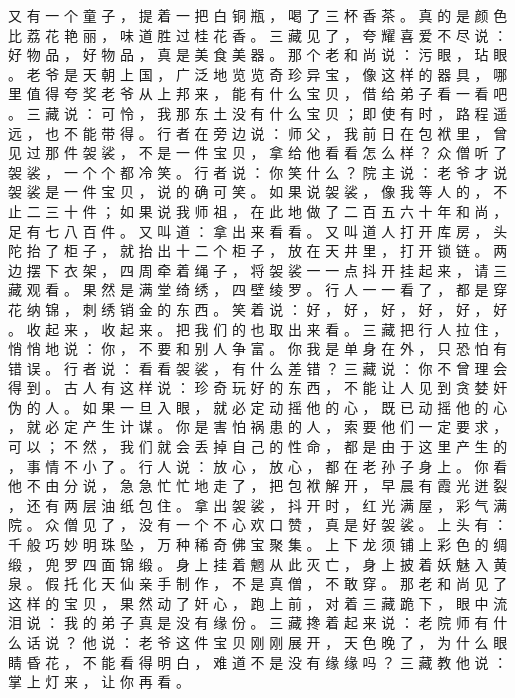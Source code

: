 {又 有 一 个 童 子 ， 提 着 一 把 白 铜 瓶 ， 喝 了 三 杯 香 茶 。
真 的 是 颜 色 比 荔 花 艳 丽 ， 味 道 胜 过 桂 花 香 。
三 藏 见 了 ， 夸 耀 喜 爱 不 尽 说 ： 好 物 品 ， 好 物 品 ， 真 是 美 食 美 器 。
那 个 老 和 尚 说 ： 污 眼 ， 玷 眼 。
老 爷 是 天 朝 上 国 ， 广 泛 地 览 览 奇 珍 异 宝 ， 像 这 样 的 器 具 ， 哪 里 值 得 夸 奖 老 爷 从 上 邦 来 ， 能 有 什 么 宝 贝 ， 借 给 弟 子 看 一 看 吧 。 三 藏 说 ： 可 怜 ， 我 那 东 土 没 有 什 么 宝 贝 ； 即 使 有 时 ， 路 程 遥 远 ， 也 不 能 带 得 。
行 者 在 旁 边 说 ： 师 父 ， 我 前 日 在 包 袱 里 ， 曾 见 过 那 件 袈 裟 ， 不 是 一 件 宝 贝 ， 拿 给 他 看 看 怎 么 样 ？ 众 僧 听 了 袈 裟 ， 一 个 个 都 冷 笑 。
行 者 说 ： 你 笑 什 么 ？ 院 主 说 ： 老 爷 才 说 袈 裟 是 一 件 宝 贝 ， 说 的 确 可 笑 。
如 果 说 袈 裟 ， 像 我 等 人 的 ， 不 止 二 三 十 件 ； 如 果 说 我 师 祖 ， 在 此 地 做 了 二 百 五 六 十 年 和 尚 ， 足 有 七 八 百 件 。
又 叫 道 ： 拿 出 来 看 看 。
又 叫 道 人 打 开 库 房 ， 头 陀 抬 了 柜 子 ， 就 抬 出 十 二 个 柜 子 ， 放 在 天 井 里 ， 打 开 锁 链 。
两 边 摆 下 衣 架 ， 四 周 牵 着 绳 子 ， 将 袈 裟 一 一 点 抖 开 挂 起 来 ， 请 三 藏 观 看 。
果 然 是 满 堂 绮 绣 ， 四 壁 绫 罗 。
行 人 一 一 看 了 ， 都 是 穿 花 纳 锦 ， 刺 绣 销 金 的 东 西 。 笑 着 说 ： 好 ， 好 ， 好 ， 好 ， 好 ， 好 。
收 起 来 ， 收 起 来 。
把 我 们 的 也 取 出 来 看 。
三 藏 把 行 人 拉 住 ， 悄 悄 地 说 ： 你 ， 不 要 和 别 人 争 富 。
你 我 是 单 身 在 外 ， 只 恐 怕 有 错 误 。
行 者 说 ： 看 看 袈 裟 ， 有 什 么 差 错 ？ 三 藏 说 ： 你 不 曾 理 会 得 到 。
古 人 有 这 样 说 ： 珍 奇 玩 好 的 东 西 ， 不 能 让 人 见 到 贪 婪 奸 伪 的 人 。
如 果 一 旦 入 眼 ， 就 必 定 动 摇 他 的 心 ， 既 已 动 摇 他 的 心 ， 就 必 定 产 生 计 谋 。
你 是 害 怕 祸 患 的 人 ， 索 要 他 们 一 定 要 求 ， 可 以 ； 不 然 ， 我 们 就 会 丢 掉 自 己 的 性 命 ， 都 是 由 于 这 里 产 生 的 ， 事 情 不 小 了 。
行 人 说 ： 放 心 ， 放 心 ， 都 在 老 孙 子 身 上 。
你 看 他 不 由 分 说 ， 急 急 忙 忙 地 走 了 ， 把 包 袱 解 开 ， 早 晨 有 霞 光 迸 裂 ， 还 有 两 层 油 纸 包 住 。
拿 出 袈 裟 ， 抖 开 时 ， 红 光 满 屋 ， 彩 气 满 院 。
众 僧 见 了 ， 没 有 一 个 不 心 欢 口 赞 ， 真 是 好 袈 裟 。
上 头 有 ： 千 般 巧 妙 明 珠 坠 ， 万 种 稀 奇 佛 宝 聚 集 。
上 下 龙 须 铺 上 彩 色 的 绸 缎 ， 兜 罗 四 面 锦 缎 。
身 上 挂 着 魍 从 此 灭 亡 ， 身 上 披 着 妖 魅 入 黄 泉 。
假 托 化 天 仙 亲 手 制 作 ， 不 是 真 僧 ， 不 敢 穿 。
那 老 和 尚 见 了 这 样 的 宝 贝 ， 果 然 动 了 奸 心 ， 跑 上 前 ， 对 着 三 藏 跪 下 ， 眼 中 流 泪 说 ： 我 的 弟 子 真 是 没 有 缘 份 。
三 藏 搀 着 起 来 说 ： 老 院 师 有 什 么 话 说 ？ 他 说 ： 老 爷 这 件 宝 贝 刚 刚 展 开 ， 天 色 晚 了 ， 为 什 么 眼 睛 昏 花 ， 不 能 看 得 明 白 ， 难 道 不 是 没 有 缘 缘 吗 ？ 三 藏 教 他 说 ： 掌 上 灯 来 ， 让 你 再 看 。
}
